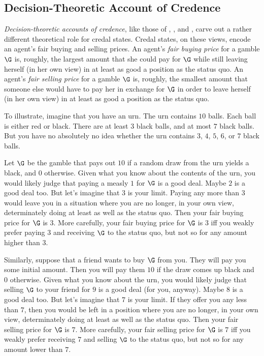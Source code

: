 \subsection{Decision-Theoretic Account of Credence}

\textit{Decision-theoretic accounts of credence}, like those of \citet{Ramsey1931}, \citet{deFinetti1931, deFinetti1964}, and \citet{Walley1991}, carve out a rather different theoretical role for credal states. Credal states, on these views, encode an agent's fair buying and selling prices. An agent's \textit{fair buying price} for a gamble $\G$ is, roughly, the largest amount that she could pay for $\G$ while still leaving herself (in her own view) in at least as good a position as the status quo. An agent's \textit{fair selling price} for a gamble $\G$ is, roughly, the smallest amount that someone else would have to pay her in exchange for $\G$ in order to leave herself (in her own view) in at least as good a position as the status quo.

To illustrate, imagine that you have an urn. The urn contains $10$ balls. Each ball is either red or black. There are at least $3$ black balls, and at most $7$ black balls. But you have no absolutely no idea whether the urn contains $3$, $4$, $5$, $6$, or $7$ black balls.

Let $\G$ be the gamble that pays out \textsterling$10$ if a random draw from the urn yields a black, and \textsterling$0$ otherwise. Given what you know about the contents of the urn, you would likely judge that paying a measly \textsterling$1$ for $\G$ is a good deal. Maybe \textsterling$2$ is a good deal too. But let's imagine that \textsterling$3$ is your limit. Paying any more than \textsterling$3$ would leave you in a situation where you are no longer, in your own view, determinately doing at least as well as the status quo. Then your fair buying price for $\G$ is $3$. More carefully, your fair buying price for $\G$ is $3$ iff you weakly prefer paying $3$ and receiving $\G$ to the status quo, but not so for any amount higher than $3$.

Similarly, suppose that a friend wants to buy $\G$ from you. They will pay you some initial amount. Then you will pay them \textsterling$10$ if the draw comes up black and \textsterling$0$ otherwise. Given what you know about the urn, you would likely judge that selling $\G$ to your friend for \textsterling$9$ is a good deal (for you, anyway). Maybe \textsterling$8$ is a good deal too. But let's imagine that \textsterling$7$ is your limit. If they offer you any less than \textsterling$7$, then you would be left in a position where you are no longer, in your own view, determinately doing at least as well as the status quo. Then your fair selling price for $\G$ is $7$. More carefully, your fair selling price for $\G$ is $7$ iff you weakly prefer receiving $7$ and selling $\G$ to the status quo, but not so for any amount lower than $7$.

